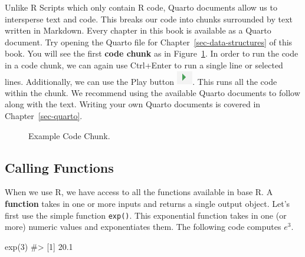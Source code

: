 \documentclass[
  letterpaper,
]{latex/krantz}
\makeatletter
\newenvironment{Shaded}{\begin{snugshade}}{\end{snugshade}}
\newcommand{\CommentTok}[1]{\textcolor[rgb]{0.37,0.37,0.37}{#1}}
\newcommand{\DecValTok}[1]{\textcolor[rgb]{0.68,0.00,0.00}{#1}}
\newcommand{\FunctionTok}[1]{\textcolor[rgb]{0.28,0.35,0.67}{#1}}
\newcommand{\NormalTok}[1]{\textcolor[rgb]{0.00,0.23,0.31}{#1}}
\newenvironment{kframe}{%
\medskip{}
\setlength{\fboxsep}{.8em}
 \def\at@end@of@kframe{}%
 \ifinner\ifhmode%
  \def\at@end@of@kframe{\end{minipage}}%
  \begin{minipage}{\columnwidth}%
 \fi\fi%
 \def\FrameCommand##1{\hskip\@totalleftmargin \hskip-\fboxsep
 \colorbox{shadecolor}{##1}\hskip-\fboxsep
     \hskip-\linewidth \hskip-\@totalleftmargin \hskip\columnwidth}%
 \MakeFramed {\advance\hsize-\width
   \@totalleftmargin\z@ \linewidth\hsize
   \@setminipage}}%
 {\par\unskip\endMakeFramed%
 \at@end@of@kframe}
\renewenvironment{Shaded}{\begin{kframe}}{\end{kframe}}
\makeatother
\begin{document}
Unlike R Scripts which only contain R code, Quarto
 documents allow us to intersperse text and
code. This breaks our code into chunks surrounded by text written in
Markdown. Every chapter in this book is available as a Quarto document.
Try opening the Quarto file for Chapter~\ref{sec-data-structures} of
this book. You will see the first \textbf{code chunk}
 as in Figure~\ref{fig-code-chunk}. In order to
run the code in a code chunk, we can again use Ctrl+Enter to run a
single line or selected lines. Additionally, we can use the Play button
\includegraphics[width=0.27778in,height=\textheight]{book/images/intro_to_r/run-current-chunk.png}.
This runs all the code within the chunk. We recommend using the
available Quarto documents to follow along with the text. Writing your
own Quarto documents is covered in Chapter~\ref{sec-quarto}.

\begin{figure}


\caption{\label{fig-code-chunk}Example Code Chunk.}

\end{figure}%

\subsection{Calling Functions}\label{calling-functions}

When we use R, we have access to all the functions available in base R.
A \textbf{function} takes in one or more inputs and
returns a single output object. Let's first use the simple function
\texttt{exp()}. This exponential
function takes in one (or more) numeric values and exponentiates them.
The following code computes \(e^3\).

\begin{Shaded}
\begin{Highlighting}[]
\FunctionTok{exp}\NormalTok{(}\DecValTok{3}\NormalTok{)}
\CommentTok{\#\textgreater{} [1] 20.1}
\end{Highlighting}
\end{Shaded}
\end{document}
